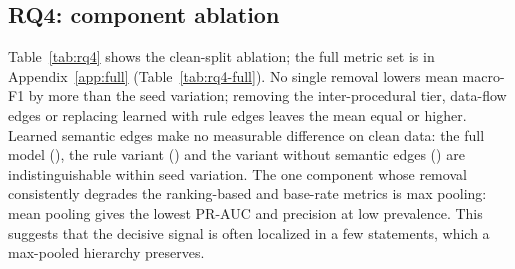 \documentclass[pdflatex,sn-mathphys-num]{sn-jnl}
\begin{document}
\subsection{RQ4: component ablation}\label{sec:r-rq4}
Table~\ref{tab:rq4} shows the clean-split ablation; the full metric set is in
Appendix~\ref{app:full} (Table~\ref{tab:rq4-full}). No single removal lowers
mean macro-F1 by more than the seed variation; removing the inter-procedural
tier, data-flow edges or replacing learned with rule edges leaves the mean
equal or higher. Learned semantic edges make no measurable difference on clean
data: the full model (\RqFourFullTestFOneMacro), the rule variant
(\RqFourRuleESemTestFOneMacro) and the variant without semantic edges
(\RqFourNoESemTestFOneMacro) are indistinguishable within seed variation. The
one component whose removal consistently degrades the ranking-based and
base-rate metrics is max pooling: mean pooling gives the lowest PR-AUC and
precision at low prevalence. This suggests that the decisive signal is often
localized in a few statements, which a max-pooled hierarchy preserves.
\end{document}
